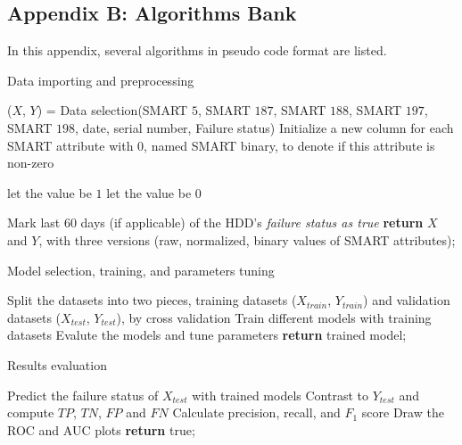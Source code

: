 \documentclass[12pt,a4paper,english]{amsart}
\begin{document}
\newpage

\subsection*{Appendix B: Algorithms Bank}

\begin{appendix}
	In this appendix, several algorithms in pseudo code format are listed.
	\begin{algorithm}[h]
		\caption{Data importing and preprocessing}\label{alg:data}
		\LinesNumbered 
		($X$, $Y$) = Data selection(SMART $5$, SMART $187$, SMART $188$, SMART $197$, SMART $198$, date, serial number, Failure status)\; 
		Initialize a new column for each SMART attribute with $0$, named SMART binary, to denote if this attribute is non-zero \;
		
		{
			{
				let the value be $1$
			}
		}
		{
			let the value be $0$ \;
		}
	
		{ 
			Mark last $60$ days (if applicable) of the HDD's \textit{failure status as true} \; 
		}
		\textbf{return} $X$ and $Y$, with three versions (raw, normalized, binary values of SMART attributes);
	\end{algorithm} 
	
	\begin{algorithm}[h]
		\caption{Model selection, training, and parameters tuning}\label{alg:model}
		\LinesNumbered 
		Split the datasets into two pieces, training datasets ($X_{train}$, $Y_{train}$) and validation datasets ($X_{test}$, $Y_{test}$), by cross validation\;
		Train different models with training datasets\;
		{
			Evalute the models and tune parameters\;
		}
		\textbf{return} trained model;
	\end{algorithm} 
	
	\begin{algorithm}[h]
		\caption{Results evaluation}\label{alg:eval}
		\LinesNumbered 
		Predict the failure status of $X_{test}$ with trained models\;
		Contrast to $Y_{test}$ and compute $TP$, $TN$, $FP$ and $FN$\;
		Calculate precision, recall, and $F_1$ score\;
		Draw the ROC and AUC plots\;
		\textbf{return} true;
	\end{algorithm}
\end{appendix}
\end{document}
